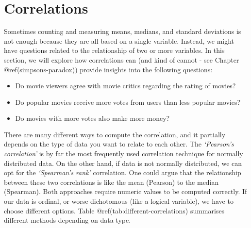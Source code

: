 \documentclass[
  letterpaper,
]{krantz}
\begin{document}

\chapter{Correlations}\label{sec-correlations}

Sometimes counting and measuring means, medians, and standard deviations
is not enough because they are all based on a single variable. Instead,
we might have questions related to the relationship of two or more
variables. In this section, we will explore how correlations can (and
kind of cannot - see Chapter @ref(simpsons-paradox)) provide insights
into the following questions:

\begin{itemize}
\item
  Do movie viewers agree with movie critics regarding the rating of
  movies?
\item
  Do popular movies receive more votes from users than less popular
  movies?
\item
  Do movies with more votes also make more money?
\end{itemize}

There are many different ways to compute the correlation, and it
partially depends on the type of data you want to relate to each other.
The \emph{`Pearson's correlation'} is by far the most frequently used
correlation technique for normally distributed data. On the other hand,
if data is not normally distributed, we can opt for the
\emph{`Spearman's rank'} correlation. One could argue that the
relationship between these two correlations is like the mean (Pearson)
to the median (Spearman). Both approaches require numeric values to be
computed correctly. If our data is ordinal, or worse dichotomous (like a
logical variable), we have to choose different options. Table
@ref(tab:different-correlations) summarises different methods depending
on data type.
\end{document}

